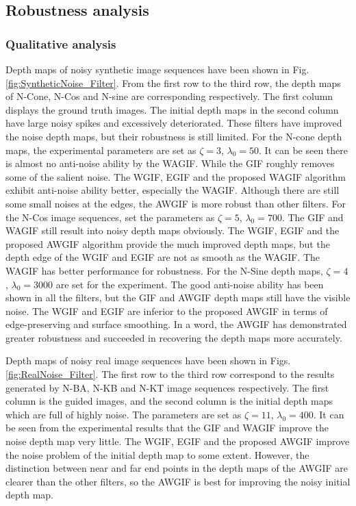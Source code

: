 \documentclass[a4paper,fleqn]{cas-dc}
\begin{document}
\subsection{Robustness analysis}\label{Robustness}

\subsubsection{Qualitative analysis}\label{QualitativeRo}
Depth maps of noisy synthetic image sequences have been shown in Fig. \ref{fig:SyntheticNoise_Filter}. From the first row to the third row, the depth maps of N-Cone, N-Cos and N-sine are corresponding respectively. The first column displays the ground truth images. The initial depth maps in the second column have large noisy spikes and excessively deteriorated. These filters have improved the noise depth maps, but their robustness is still limited. For the N-cone depth maps, the experimental parameters are set as $\zeta = 3$, $\lambda_0 = 50$. It can be seen there is almost no anti-noise ability by the WAGIF. While the GIF roughly removes some of the salient noise. The WGIF, EGIF and the proposed WAGIF algorithm exhibit anti-noise ability better, especially the WAGIF. Although there are still some small noises at the edges, the AWGIF is more robust than other filters. For the N-Cos image sequences, set the parameters as $\zeta = 5$, $\lambda_0 = 700$. The GIF and WAGIF still result into noisy depth maps obviously. The WGIF, EGIF and the proposed AWGIF algorithm provide the much improved depth maps, but the depth edge of the WGIF and EGIF are not as smooth as the WAGIF. The WAGIF has better performance for robustness. For the N-Sine depth maps, $\zeta = 4$, $\lambda_0 = 3000$ are set for the experiment. The good anti-noise ability has been shown in all the filters, but the GIF and AWGIF depth maps still have the visible noise. The WGIF and EGIF are inferior to the proposed AWGIF in terms of edge-preserving and surface smoothing. In a word, the AWGIF has demonstrated greater robustness and succeeded in recovering the depth maps more accurately. 

Depth maps of noisy real image sequences have been shown in Figs. \ref{fig:RealNoise_Filter}. The first row to the third row correspond to the results generated by N-BA, N-KB and N-KT image sequences respectively. The first column is the guided images, and the second column is the initial depth maps which are full of highly noise. The parameters are set as $\zeta = 11$, $\lambda_0 = 400$. It can be seen from the experimental results that the GIF and WAGIF improve the noise depth map very little. The WGIF, EGIF and the proposed AWGIF improve the noise problem of the initial depth map to some extent. However, the distinction between near and far end points in the depth maps of the AWGIF are clearer than the other filters, so the AWGIF is best for improving the noisy initial depth map. 
\end{document}
